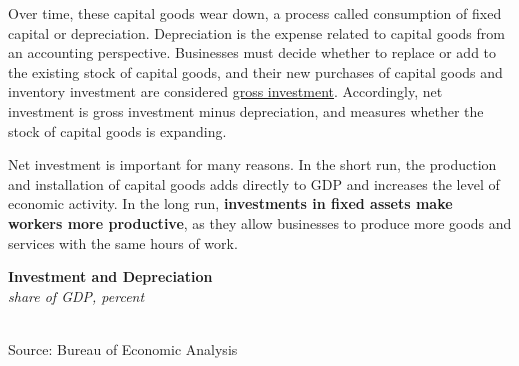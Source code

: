 \documentclass{report}
\makeatletter
\newcommand{\tbllink}[1]{\href{https://raw.githubusercontent.com/bdecon/US-chartbook/master/chartbook/data/#1}{\faTable}}
\newcommand*\short[1]{\expandafter\@gobbletwo\number\numexpr#1\relax}
\newcommand{\stdnode}[3]{\node[below, align=left, shift=({#1,#2})]{#3};}
\newcommand{\shdateaxisticks}{
		date coordinates in=x, axis line style={draw=none},
		xmax={2023-11-01},
		max space between ticks=40,	    
		xtick={{1990-01-01}, {1995-01-01}, {2000-01-01}, 
			{2005-01-01}, {2010-01-01}, {2015-01-01}, {2020-01-01}},
		minor xtick={},
		enlarge y limits={0.06}, enlarge x limits={0.01},
		}
\newcommand{\bbar}[2]{extra #1 ticks = {{#2}}, extra #1 tick labels = ,
		extra #1 tick style = {grid=major, grid style={thick, black!25}},}
\newcommand{\stdline}[4]{\addplot[very thick, no markers, color=#1] 
		table [x=#2, y=#3, col sep=comma] {#4};	}
\newcommand{\thickline}[4]{\addplot[ultra thick, no markers, color=#1] 
		table [x=#2, y=#3, col sep=comma] {#4};	}
\newcommand{\rbars}{
		\fill[color=black!10] (axis cs:{1990-07-01},\pgfkeysvalueof{/pgfplots/ymin}) rectangle 
			(axis cs:{1991-03-01}, \pgfkeysvalueof{/pgfplots/ymax});
		\fill[color=black!10] (axis cs:{2007-12-01},\pgfkeysvalueof{/pgfplots/ymin}) rectangle 
			(axis cs:{2009-07-01}, \pgfkeysvalueof{/pgfplots/ymax});
		\fill[color=black!10] (axis cs:{2001-03-01},\pgfkeysvalueof{/pgfplots/ymin}) rectangle 
			(axis cs:{2001-11-01}, \pgfkeysvalueof{/pgfplots/ymax});
		\fill[color=black!10] (axis cs:{2020-02-01},\pgfkeysvalueof{/pgfplots/ymin}) rectangle 
			(axis cs:{2020-05-01}, \pgfkeysvalueof{/pgfplots/ymax});}
\makeatother
\begin{document}
{\begin{minipage}{0.76\textwidth}
Over time, these capital goods wear down, a process called consumption of fixed capital or depreciation. Depreciation is the expense related to capital goods from an accounting perspective. Businesses must decide whether to replace or add to the existing stock of capital goods, and their new purchases of capital goods and inventory investment are considered \href{https://www.bea.gov/help/glossary/gross-private-domestic-investment}{gross investment}. Accordingly, net investment is gross investment minus depreciation, and measures whether the stock of capital goods is expanding.

Net investment is important for many reasons. In the short run, the production and installation of capital goods adds directly to GDP and increases the level of economic activity. In the long run, \textbf{investments in fixed assets make workers more productive}, as they allow businesses to produce more goods and services with the same hours of work. 
\end{minipage}
\vspace{1mm}

\begin{minipage}{0.355\textwidth}
\normalsize \textbf{Investment and Depreciation}\\
\footnotesize{\textit{share of GDP, percent}}\\
\hspace*{-2mm} \\
\footnotesize{Source: Bureau of Economic Analysis} \hfill \tbllink{businv_main.csv}
\end{minipage} \hspace{4.5mm}
\begin{minipage}{0.365\textwidth}
\small 
\end{minipage}


}
\end{document}
